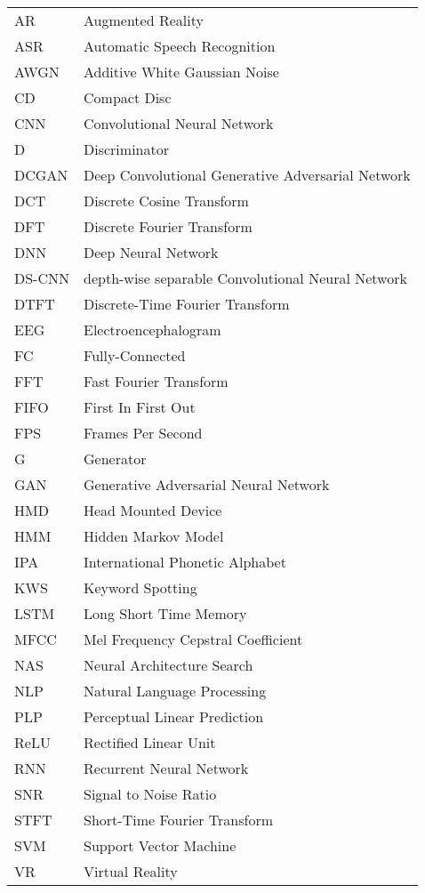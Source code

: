 
\chapter*{}

\begin{tabular}{ l l }
AR & Augmented Reality\\
ASR & Automatic Speech Recognition\\
AWGN & Additive White Gaussian Noise\\
CD & Compact Disc\\
CNN & Convolutional Neural Network\\
D & Discriminator\\
DCGAN & Deep Convolutional Generative Adversarial Network\\
DCT & Discrete Cosine Transform\\
DFT & Discrete Fourier Transform\\
DNN & Deep Neural Network\\
DS-CNN & depth-wise separable Convolutional Neural Network\\
DTFT & Discrete-Time Fourier Transform\\
EEG & Electroencephalogram\\
FC & Fully-Connected\\
FFT & Fast Fourier Transform\\
FIFO & First In First Out\\
FPS & Frames Per Second\\
G & Generator\\
GAN & Generative Adversarial Neural Network\\
HMD & Head Mounted Device\\
HMM & Hidden Markov Model\\
IPA & International Phonetic Alphabet\\
KWS & Keyword Spotting\\
LSTM & Long Short Time Memory\\
MFCC & Mel Frequency Cepstral Coefficient\\
NAS & Neural Architecture Search\\
NLP & Natural Language Processing\\
PLP & Perceptual Linear Prediction\\
ReLU & Rectified Linear Unit\\
RNN & Recurrent Neural Network\\
SNR & Signal to Noise Ratio\\
STFT & Short-Time Fourier Transform\\
SVM & Support Vector Machine\\
VR & Virtual Reality\\
\end{tabular}